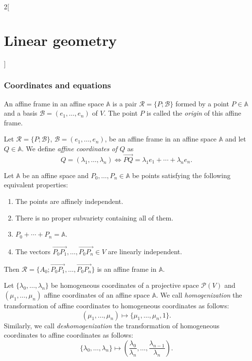 \documentclass[class=article,10pt,crop=false]{standalone}
\begin{document}
\begin{multicols}{2}[\section{Linear geometry}]
\subsubsection*{Coordinates and equations}
\begin{definition}
An affine frame in an affine space $\mathbb{A}$ is a pair $\mathcal{R}=\{P;\mathcal{B}\}$ formed by a point $P\in\mathbb{A}$ and a basis $\mathcal{B}=(e_1,\ldots,e_n)$ of $V$. The point $P$ is called the \textit{origin} of this affine frame.
\end{definition}
\begin{definition}
Let $\mathcal{R}=\{P;\mathcal{B}\}$, $\mathcal{B}=(e_1,\ldots,e_n)$, be an affine frame in an affine space $\mathbb{A}$ and let $Q\in\mathbb{A}$. We define \textit{affine coordinates of $Q$} as $$Q=(\lambda_1,\ldots,\lambda_n)\iff\overrightarrow{PQ}=\lambda_1e_1+\cdots+\lambda_ne_n.$$
\end{definition}
\begin{prop}
Let $\mathbb{A}$ be an affine space and $P_0,\ldots,P_n\in\mathbb{A}$ be points satisfying the following equivalent properties:
\begin{enumerate}
    \item The points are affinely independent.
    \item There is no proper subvariety containing all of them.
    \item $P_0+\cdots+P_n=\mathbb{A}$.
    \item The vectors $\overrightarrow{P_0P_1},\ldots,\overrightarrow{P_0P_n}\in V$ are linearly independent.
\end{enumerate}
Then $\mathcal{R}=\{A_0;\overrightarrow{P_0P_1},\ldots,\overrightarrow{P_0P_n}\}$ is an affine frame in $\mathbb{A}$.
\end{prop}
\begin{definition}
Let $\{\lambda_0,\ldots,\lambda_n\}$ be homogeneous coordinates of a projective space $\mathcal{P}(V)$ and $(\mu_1,\ldots,\mu_n)$ affine coordinates of an affine space $\mathbb{A}$. We call \textit{homogenization} the transformation of affine coordinates to homogeneous coordinates as follows: $$(\mu_1,\ldots,\mu_n)\mapsto\{\mu_1,\ldots,\mu_n,1\}.$$ Similarly, we call \textit{deshomogenization} the transformation of homogeneous coordinates to affine coordinates as follows: $$\{\lambda_0,\ldots,\lambda_n\}\mapsto\left(\frac{\lambda_0}{\lambda_n},\ldots,\frac{\lambda_{n-1}}{\lambda_n}\right).$$
\end{definition}
\begin{definition}

\end{definition}
\end{multicols}
\end{document}
